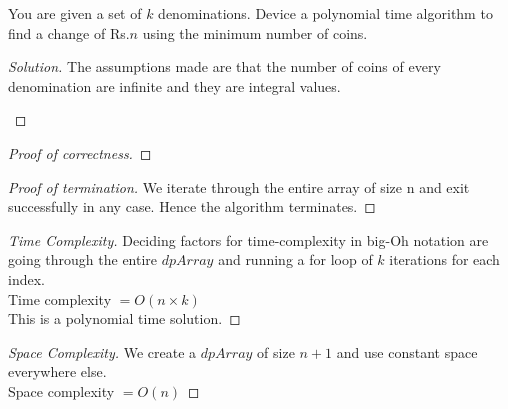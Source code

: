 \begin{solution}{4.2}
    \begin{question}
        You are given a set of $k$ denominations. Device a polynomial time algorithm to find a change of Rs.$n$ using the minimum number of
coins.    
    \end{question}
    \tcblower{}
    \begin{proof}[Solution]
        The assumptions made are that the number of coins of every denomination are infinite and they are integral values.\\
        \begin{algorithm}[H]
        \caption{Find total possible combinations of denominations to achieve value of n}
        \begin{algorithmic}
               
             
                \For{$i$ in $[0, k)$}
                    \EndIf{}
                \EndFor{}
            \EndFor{}
        \EndProcedure{}
        \end{algorithmic}
        \end{algorithm}
    \end{proof}
    \begin{proof}[Proof of correctness]
    \end{proof}
    \begin{proof}[Proof of termination]
        We iterate through the entire array of size n and exit successfully in any case. Hence the algorithm terminates.
    \end{proof}
    \begin{proof}[Time Complexity]
    Deciding factors for time-complexity in big-Oh notation are going through the entire $dpArray$ and running a for loop of $k$ iterations for each index.\\
    Time complexity $=O(n\times k)$\\
    This is a polynomial time solution.
    \end{proof}
    \begin{proof}[Space Complexity]
    We create a $dpArray$ of size $n+1$ and use constant space everywhere else.\\
    Space complexity $=O(n)$
    \end{proof}
\end{solution}
